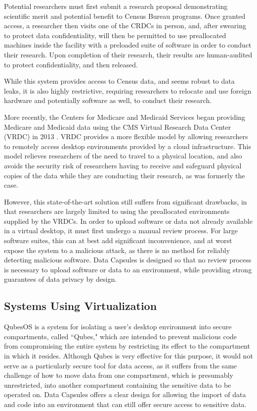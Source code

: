 \documentclass{acm_proc_article-sp}
\begin{document}
Potential researchers must first submit a research proposal demonstrating
scientific merit and potential benefit to Census Bureau programs.  Once granted
access, a researcher then visits one of the CRDCs in person, and, after swearing
to protect data confidentiality, will then be permitted to use preallocated
machines inside the facility with a preloaded suite of software in order to
conduct their research.  Upon completion of their research, their results are
human-audited to protect confidentiality, and then released.

While this system provides access to Census data, and seems robust to data
leaks, it is also highly restrictive, requiring researchers to relocate and use
foreign hardware and potentially software as well, to conduct their research.

More recently, the Centers for Medicare and Medicaid Services began providing
Medicare and Medicaid data using the CMS Virtual Research Data Center (VRDC) in
2013 \cite{vrdc}.  VRDC provides a more flexible model by allowing researchers
to remotely access desktop environments provided by a cloud infrastructure.
This model relieves researchers of the need to travel to a physical location,
and also avoids the security risk of researchers having to receive and
safeguard physical copies of the data while they are conducting their research,
as was formerly the case.

However, this state-of-the-art solution still suffers from significant
drawbacks, in that researchers are largely limited to using the preallocated
environments supplied by the VRDCs.  In order to upload software or data not
already available in a virtual desktop, it must first undergo a manual review
process.  For large software suites, this can at best add significant
inconvenience, and at worst expose the system to a malicious attack, as there is
no method for reliably detecting malicious software.  Data Capsules is designed
so that no review process is necessary to upload software or data to an
environment, while providing strong guarantees of data privacy by design.

\subsection{Systems Using Virtualization}

QubesOS \cite{qubes} is a system for isolating a user's desktop environment into
secure compartments, called ``Qubes," which are intended to prevent malicious
code from compromising the entire system by restricting its effect to the
compartment in which it resides.  Although Qubes is very effective for this 
purpose, it would not serve as a particularly secure tool for data access, as it
suffers from the same challenge of how to move data from one compartment, which
is presumably unrestricted, into another compartment containing the sensitive
data to be operated on.  Data Capsules offers a clear design for allowing the
import of data and code into an environment that can still offer secure access
to sensitive data.
\end{document}
